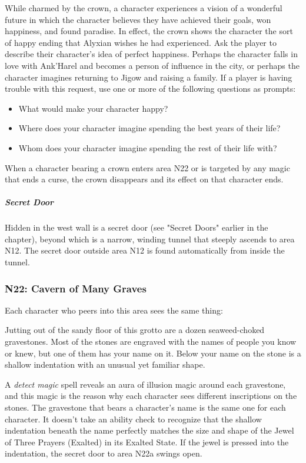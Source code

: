 \documentclass[10pt,a4paper,twoside,fancy,bg=print,twocolumn,openany,nodeprecatedcode]{dndbook}
\begin{document}
While charmed by the crown, a character experiences a vision of a wonderful future in which the character believes they have achieved their goals, won happiness, and found paradise. In effect, the crown shows the character the sort of happy ending that Alyxian wishes he had experienced. Ask the player to describe their character's idea of perfect happiness. Perhaps the character falls in love with Ank'Harel and becomes a person of influence in the city, or perhaps the character imagines returning to Jigow and raising a family. If a player is having trouble with this request, use one or more of the following questions as prompts:


\begin{itemize}
\item What would make your character happy?
\item Where does your character imagine spending the best years of their life?
\item Whom does your character imagine spending the rest of their life with?
\end{itemize}

When a character bearing a crown enters area N22 or is targeted by any magic that ends a curse, the crown disappears and its effect on that character ends.

\subparagraph{Secret Door}
Hidden in the west wall is a secret door (see "Secret Doors" earlier in the chapter), beyond which is a narrow, winding tunnel that steeply ascends to area N12. The secret door outside area N12 is found automatically from inside the tunnel.

\subsubsection{N22: Cavern of Many Graves}
Each character who peers into this area sees the same thing:

\begin{DndReadAloud}{}
Jutting out of the sandy floor of this grotto are a dozen seaweed-choked gravestones. Most of the stones are engraved with the names of people you know or knew, but one of them has your name on it. Below your name on the stone is a shallow indentation with an unusual yet familiar shape.

\end{DndReadAloud}

A \textit{detect magic} spell reveals an aura of illusion magic around each gravestone, and this magic is the reason why each character sees different inscriptions on the stones. The gravestone that bears a character's name is the same one for each character. It doesn't take an ability check to recognize that the shallow indentation beneath the name perfectly matches the size and shape of the Jewel of Three Prayers (Exalted) in its Exalted State. If the jewel is pressed into the indentation, the secret door to area N22a swings open.
\end{document}
